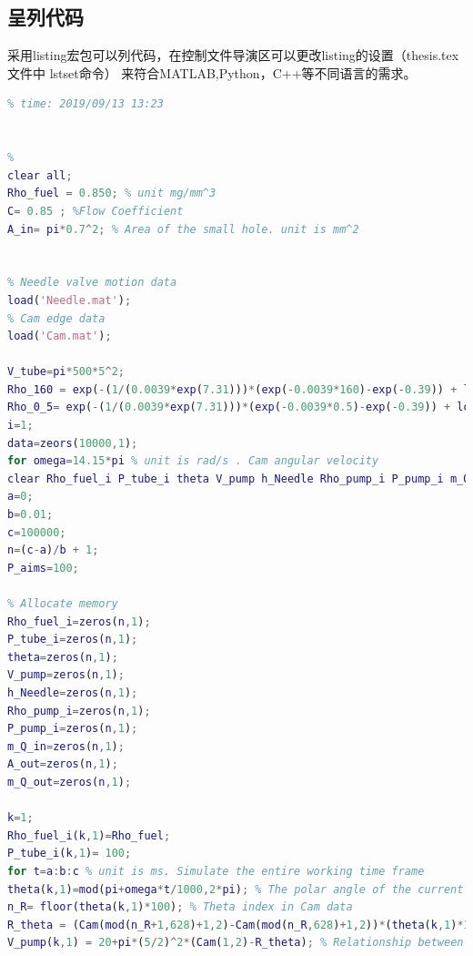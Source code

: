 \subsection{呈列代码}
采用listing宏包可以列代码，在控制文件导演区可以更改listing的设置（thesis.tex文件中 lstset命令）
来符合MATLAB,Python，C++等不同语言的需求。
\begin{lstlisting}[language=matlab]
% 2019_A Q2
% time: 2019/09/13 13:23


% 
clear all;
Rho_fuel = 0.850; % unit mg/mm^3
C= 0.85 ; %Flow Coefficient
A_in= pi*0.7^2; % Area of the small hole. unit is mm^2


% Needle valve motion data
load('Needle.mat');
% Cam edge data
load('Cam.mat');

V_tube=pi*500*5^2;
Rho_160 = exp(-(1/(0.0039*exp(7.31)))*(exp(-0.0039*160)-exp(-0.39)) + log(0.85)); % Fuel density at a pressure of 160 MPa
Rho_0_5= exp(-(1/(0.0039*exp(7.31)))*(exp(-0.0039*0.5)-exp(-0.39)) + log(0.85)); % Fuel density at a pressure of 0.5 MPa
i=1;
data=zeors(10000,1);
for omega=14.15*pi % unit is rad/s . Cam angular velocity
clear Rho_fuel_i P_tube_i theta V_pump h_Needle Rho_pump_i P_pump_i m_Q_in A_out m_Q_out
a=0;
b=0.01;
c=100000;
n=(c-a)/b + 1;
P_aims=100;

% Allocate memory
Rho_fuel_i=zeros(n,1);
P_tube_i=zeros(n,1);
theta=zeros(n,1);
V_pump=zeros(n,1);
h_Needle=zeros(n,1);
Rho_pump_i=zeros(n,1);
P_pump_i=zeros(n,1);
m_Q_in=zeros(n,1);
A_out=zeros(n,1);
m_Q_out=zeros(n,1);

k=1;
Rho_fuel_i(k,1)=Rho_fuel;
P_tube_i(k,1)= 100;
for t=a:b:c % unit is ms. Simulate the entire working time frame
theta(k,1)=mod(pi+omega*t/1000,2*pi); % The polar angle of the current moment cam. (unit is rad)
n_R= floor(theta(k,1)*100); % Theta index in Cam data
R_theta = (Cam(mod(n_R+1,628)+1,2)-Cam(mod(n_R,628)+1,2))*(theta(k,1)*100-n_R)+ Cam(mod(n_R,628)+1,2) ; % The diameter of the current moment cam. (unit is mm)
V_pump(k,1) = 20+pi*(5/2)^2*(Cam(1,2)-R_theta); % Relationship between oil pump volume and pole diameter.


\end{lstlisting}
